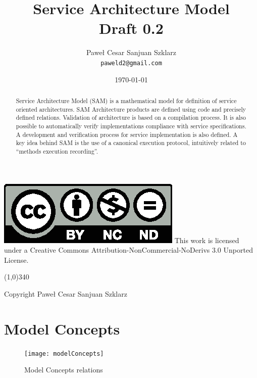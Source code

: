 \documentclass[a4paper]{article}
\title{Service Architecture Model \\ Draft 0.2}
\author{Paweł Cesar Sanjuan Szklarz \\ \texttt{paweld2@gmail.com}}
\date{\today}
\begin{document}
\maketitle

\begin{abstract}
Service Architecture Model (SAM) is a mathematical model for definition of service oriented architectures. SAM Architecture products are defined using code and precisely defined relations. Validation of architecture is based on a compilation process. It is also possible to automatically verify implementations compliance with service specifications. A development and verification process for service implementation is also defined. A key idea behind SAM is the use of a canonical execution protocol, intuitively related to ``methods execution recording''.
\end{abstract}

\null\vfill
\noindent
\includegraphics[scale=0.5]{by-nc-nd}
This work is licensed under a Creative Commons Attribution-NonCommercial-NoDerivs 3.0 Unported License.

\noindent\line(1,0){340}

\noindent
Copyright  Paweł Cesar Sanjuan Szklarz

\newpage
% 

\tableofcontents 
\null\vfill\noindent\newpage
\listoffigures
\null\vfill\noindent\newpage

\null\vfill\noindent\newpage

\null\vfill\noindent\newpage

\null\vfill\noindent\newpage


\section{Model Concepts}

\begin{figure}
 \centering
 \texttt{[image: modelConcepts]}
 \caption{Model Concepts relations}
 \label{fig:robotq}
\end{figure}
\end{document}
